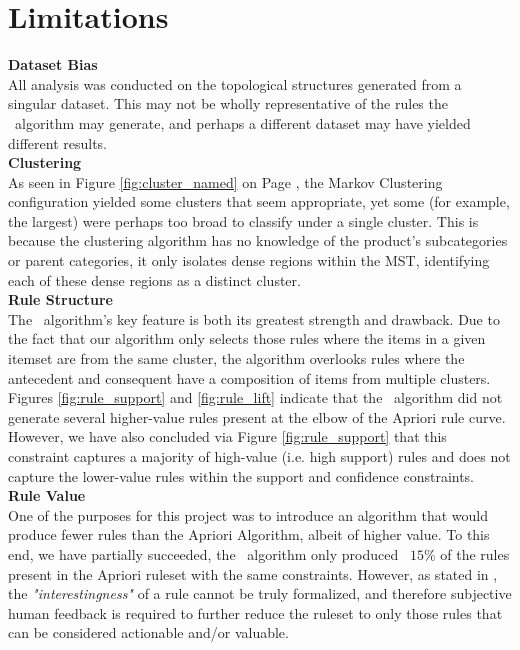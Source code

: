 \section{Limitations}
\textbf{Dataset Bias}\\
All analysis was conducted on the topological structures generated from a singular dataset. This may not be wholly representative of the rules the \algo\ algorithm may generate, and perhaps a different dataset may have yielded different results.
\\\textbf{Clustering}\\
As seen in Figure \ref{fig:cluster_named} on Page \pageref{fig:cluster_named}, the Markov Clustering configuration yielded some clusters that seem appropriate, yet some (for example, the largest) were perhaps too broad to classify under a single cluster. This is because the clustering algorithm has no knowledge of the product's subcategories or parent categories, it only isolates dense regions within the MST, identifying each of these dense regions as a distinct cluster.
\\\textbf{Rule Structure}\\
The \algo\ algorithm's key feature is both its greatest strength and drawback. Due to the fact that our algorithm only selects those rules where the items in a given itemset are from the same cluster, the algorithm overlooks rules where the antecedent and consequent have a composition of items from multiple clusters. 
Figures \ref{fig:rule_support} and \ref{fig:rule_lift} indicate that the \algo\ algorithm did not generate several higher-value rules present at the elbow of the Apriori rule curve.
However, we have also concluded via Figure \ref{fig:rule_support} that this constraint captures a majority of high-value (i.e. high support) rules and does not capture the lower-value rules within the support and confidence constraints.
\\\textbf{Rule Value}\\
One of the purposes for this project was to introduce an algorithm that would produce fewer rules than the Apriori Algorithm, albeit of higher value. To this end, we have partially succeeded, the \algo\ algorithm only produced ~$15\%$ of the rules present in the Apriori ruleset with the same constraints. However, as stated in , the \textit{"interestingness"} of a rule cannot be truly formalized, and therefore subjective human feedback is required to further reduce the ruleset to only those rules that can be considered actionable and/or valuable.


